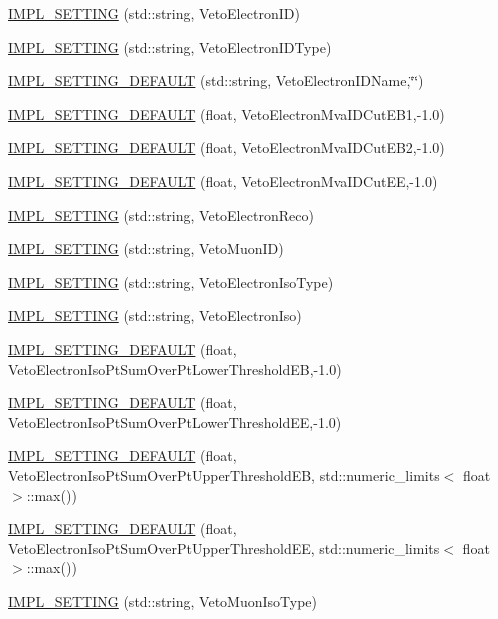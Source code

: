\begin{DoxyCompactItemize}
\item 
\hyperlink{classHttSettings_a255e2d32a36f214ad7726e7a3644a49e}{IMPL\_\-SETTING} (std::string, VetoElectronID)
\item 
\hyperlink{classHttSettings_a56584f6e7fba4d5ace62dcc2d6ef9536}{IMPL\_\-SETTING} (std::string, VetoElectronIDType)
\item 
\hyperlink{classHttSettings_a2de0dba895bb5dc411cd51818a8c21d2}{IMPL\_\-SETTING\_\-DEFAULT} (std::string, VetoElectronIDName,\char`\"{}\char`\"{})
\item 
\hyperlink{classHttSettings_abd06ccd89c1669d409d252f47f5b71cd}{IMPL\_\-SETTING\_\-DEFAULT} (float, VetoElectronMvaIDCutEB1,-\/1.0)
\item 
\hyperlink{classHttSettings_a338306a6253ee9ac8fa07e1910ec732e}{IMPL\_\-SETTING\_\-DEFAULT} (float, VetoElectronMvaIDCutEB2,-\/1.0)
\item 
\hyperlink{classHttSettings_a448ca7df803175d519a22dcd7a9fbc84}{IMPL\_\-SETTING\_\-DEFAULT} (float, VetoElectronMvaIDCutEE,-\/1.0)
\item 
\hyperlink{classHttSettings_af47c559944526dcba8e6292a83f07ea6}{IMPL\_\-SETTING} (std::string, VetoElectronReco)
\item 
\hyperlink{classHttSettings_aeaa16bed1e69ba55ea7918983bf1c0a3}{IMPL\_\-SETTING} (std::string, VetoMuonID)
\item 
\hyperlink{classHttSettings_a6dba2be5fe67cc4156a37199ee691e6d}{IMPL\_\-SETTING} (std::string, VetoElectronIsoType)
\item 
\hyperlink{classHttSettings_a780562e8bdad824022e61ce90585851e}{IMPL\_\-SETTING} (std::string, VetoElectronIso)
\item 
\hyperlink{classHttSettings_aefd84ad1695e1bdb04c825ffc3a3f11d}{IMPL\_\-SETTING\_\-DEFAULT} (float, VetoElectronIsoPtSumOverPtLowerThresholdEB,-\/1.0)
\item 
\hyperlink{classHttSettings_a74114758514943c184cc1353dc74a793}{IMPL\_\-SETTING\_\-DEFAULT} (float, VetoElectronIsoPtSumOverPtLowerThresholdEE,-\/1.0)
\item 
\hyperlink{classHttSettings_ac2ca333eba7108844e5ce46288424a36}{IMPL\_\-SETTING\_\-DEFAULT} (float, VetoElectronIsoPtSumOverPtUpperThresholdEB, std::numeric\_\-limits$<$ float $>$::max())
\item 
\hyperlink{classHttSettings_a5c7241bf19a2323faada047f5abc5c2d}{IMPL\_\-SETTING\_\-DEFAULT} (float, VetoElectronIsoPtSumOverPtUpperThresholdEE, std::numeric\_\-limits$<$ float $>$::max())
\item 
\hyperlink{classHttSettings_a208e159a71c3cb2ad25e71e057de2ec6}{IMPL\_\-SETTING} (std::string, VetoMuonIsoType)

\end{DoxyCompactItemize}
